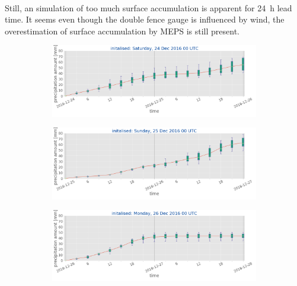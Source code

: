 \\
Still, an simulation of too much surface accumulation is apparent for \SI{24}{\hour} lead time.
It seems even though the double fence gauge is influenced by wind, the overestimation of surface accumulation by MEPS is still present. 
\\
\begin{figure}[h!]
	\centering
	\begin{subfigure}[b]{\textwidth}
		\centering
		\includegraphics[trim ={0cm 2.2cm 0cm 0cm},clip,width=\textwidth]{./fig_boxplot_sfc/20161224_0}
		\caption{}\label{fig:boxplot:24}
	\end{subfigure}
	\begin{subfigure}[b]{\textwidth}
		\centering
		\includegraphics[trim ={0cm 2.2cm 0cm 0cm},clip,width=\textwidth]{./fig_boxplot_sfc/20161225_0}
		\caption{}\label{fig:boxplot:25}
	\end{subfigure}
	\begin{subfigure}[b]{\textwidth}
		\centering
		\includegraphics[trim ={0cm 1.cm 0cm 0cm},clip,width=\textwidth]{./fig_boxplot_sfc/20161226_0}

\end{subfigure}
\end{figure}
